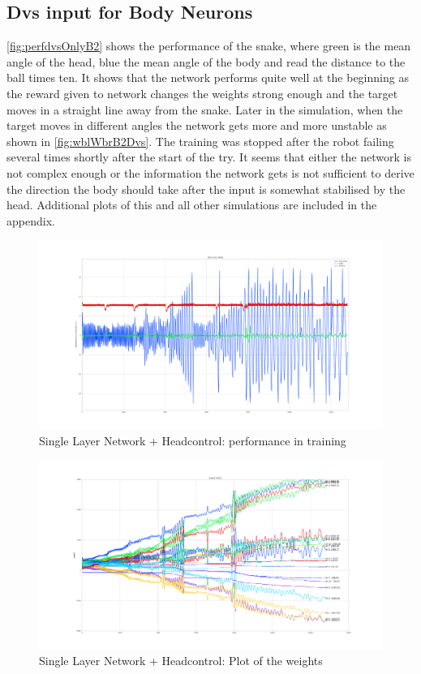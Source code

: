 \subsection{Dvs input for Body Neurons}
\autoref{fig:perfdvsOnlyB2} shows the performance of the snake, where green is the mean angle of the head, blue the mean angle of the body and read the distance to the ball times ten. It shows that the network performs quite well at the beginning as the reward given to network changes the weights strong enough and the target moves in a straight line away from the snake. Later in the simulation, when the target moves in different angles the network gets more and more unstable as shown in \autoref{fig:wblWbrB2Dvs}. The training was stopped after the robot failing several times shortly after the start of the try. It seems that either the network is not complex enough or the information the network gets is not sufficient to derive the direction the body should take after the input is somewhat stabilised by the head. Additional plots of this and all other simulations are included in the appendix.

\begin{figure}[htpb]
  \centering
  \includegraphics[width=\textwidth]{figures/plots/perfdvsOnlyB2}
  \caption{ Single Layer Network + Headcontrol: performance in training }
  \label{fig:perfdvsOnlyB2}
\end{figure}
\begin{figure}[htpb]
  \centering
  \includegraphics[width=\textwidth]{figures/plots/wblWbrB2Dvs}
  \caption{ Single Layer Network + Headcontrol: Plot of the weights }
  \label{fig:wblWbrB2Dvs}
\end{figure}
